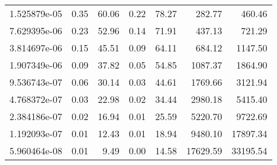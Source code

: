 \begin{tabular}{lrrrrrr}
1.525879e-05 &        0.35 &         60.06 &           0.22 &        78.27 &           282.77 &          460.46 \\
7.629395e-06 &        0.23 &         52.96 &           0.14 &        71.91 &           437.13 &          721.29 \\
3.814697e-06 &        0.15 &         45.51 &           0.09 &        64.11 &           684.12 &         1147.50 \\
1.907349e-06 &        0.09 &         37.82 &           0.05 &        54.85 &          1087.37 &         1864.90 \\
9.536743e-07 &        0.06 &         30.14 &           0.03 &        44.61 &          1769.66 &         3121.94 \\
4.768372e-07 &        0.03 &         22.98 &           0.02 &        34.44 &          2980.18 &         5415.40 \\
2.384186e-07 &        0.02 &         16.94 &           0.01 &        25.59 &          5220.70 &         9722.69 \\
1.192093e-07 &        0.01 &         12.43 &           0.01 &        18.94 &          9480.10 &        17897.34 \\
5.960464e-08 &        0.01 &          9.49 &           0.00 &        14.58 &         17629.59 &        33195.54 \\
\bottomrule
\end{tabular}
